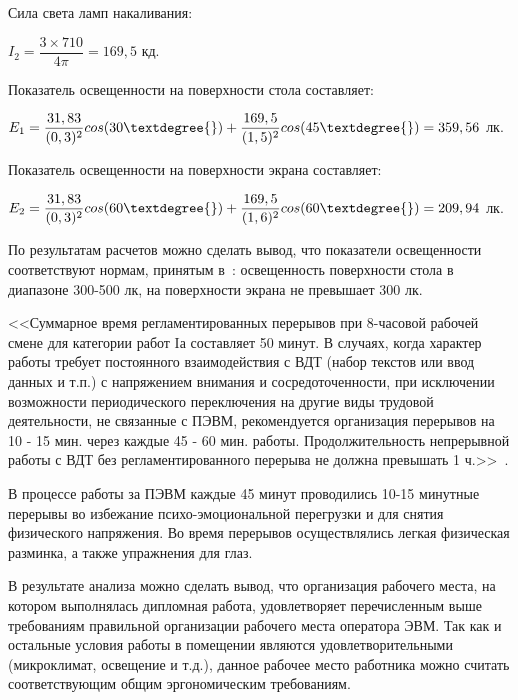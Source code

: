 Сила света ламп накаливания:
\begin{center}
$I_{2} = \dfrac{3\times710}{4\pi}= 169,5$ кд.
\end{center}

Показатель освещенности на поверхности стола составляет:
\begin{center}
$E_{1} = \dfrac{31,83}{(0,3)^{2}}cos(30\textdegree{}) + \dfrac{169,5}{(1,5)^{2}}cos(45\textdegree{})= 359,56$ лк.
\end{center}

Показатель освещенности на поверхности экрана составляет:
\begin{center}
$E_{2} = \dfrac{31,83}{(0,3)^{2}}cos(60\textdegree{}) + \dfrac{169,5}{(1,6)^{2}}cos(60\textdegree{})= 209,94$ лк.
\end{center}

По результатам расчетов можно сделать вывод, что показатели освещенности соответствуют нормам, принятым 
в~\cite{sanpin_2.4.1340-03}: освещенность поверхности стола в диапазоне 300-500 лк, на поверхности экрана
не превышает 300 лк. 

<<Суммарное время регламентированных перерывов при 8-часовой рабочей смене
для категории работ Iа составляет 50 минут. В случаях, когда характер работы требует постоянного взаимодействия с ВДТ (набор текстов или ввод данных и т.п.) с напряжением внимания и сосредоточенности, при исключении возможности периодического переключения на другие виды трудовой деятельности, не связанные с ПЭВМ, рекомендуется организация перерывов на 10 - 15 мин. через каждые 45 - 60 мин. работы.
Продолжительность непрерывной работы с ВДТ без регламентированного перерыва не должна превышать 1 ч.>>~\cite{sanpin_2.4.1340-03}.

В процессе работы за ПЭВМ каждые 45 минут проводились 10-15 минутные перерывы
во избежание психо-эмоциональной перегрузки и для снятия физического напряжения. Во время 
перерывов осуществлялись легкая физическая разминка, а также упражнения для глаз.

В результате анализа можно сделать вывод, что организация рабочего места, на котором 
выполнялась дипломная работа, удовлетворяет перечисленным выше
требованиям правильной организации рабочего места оператора ЭВМ. Так как
и остальные условия работы в помещении являются удовлетворительными 
(микроклимат, освещение и т.д.), данное рабочее место работника можно считать соответствующим 
общим эргономическим требованиям.


% 






